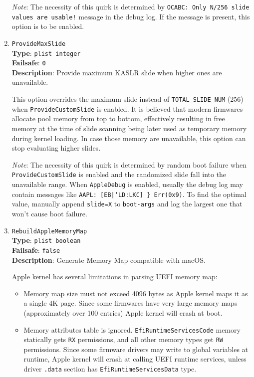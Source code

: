 \documentclass[]{article}
\providecommand{\tightlist}{%
  \setlength{\itemsep}{0pt}\setlength{\parskip}{0pt}}
\begin{document}
\begin{enumerate}
  \emph{Note}: The necessity of this quirk is determined by \texttt{OCABC: Only N/256
  slide values are usable!} message in the debug log. If the message is present,
  this option is to be enabled.

\item
  \texttt{ProvideMaxSlide}\\
  \textbf{Type}: \texttt{plist\ integer}\\
  \textbf{Failsafe}: \texttt{0}\\
  \textbf{Description}: Provide maximum KASLR slide when higher ones are unavailable.

  This option overrides the maximum slide instead of \texttt{TOTAL\_SLIDE\_NUM}
  (256) when \texttt{ProvideCustomSlide} is enabled. It is believed that modern
  firmwares allocate pool memory from top to bottom, effectively resulting in
  free memory at the time of slide scanning being later used as temporary
  memory during kernel loading. In case those memory are unavailable, this
  option can stop evaluating higher slides.

  \emph{Note}: The necessity of this quirk is determined by random boot failure
  when \texttt{ProvideCustomSlide} is enabled and the randomized slide fall
  into the unavailable range. When \texttt{AppleDebug} is enabled, usually the
  debug log may contain messages like \texttt{AAPL: [EB|`LD:LKC] \} Err(0x9)}.
  To find the optimal value, manually append \texttt{slide=X} to \texttt{boot-args}
  and log the largest one that won't cause boot failure.

\item
  \texttt{RebuildAppleMemoryMap}\\
  \textbf{Type}: \texttt{plist\ boolean}\\
  \textbf{Failsafe}: \texttt{false}\\
  \textbf{Description}: Generate Memory Map compatible with macOS.

  Apple kernel has several limitations in parsing UEFI memory map:

  \begin{itemize}
  \tightlist
  \item Memory map size must not exceed 4096 bytes as Apple kernel maps
    it as a single 4K page. Since some firmwares have very large memory maps
    (approximately over 100 entries) Apple kernel will crash at boot.
  \item Memory attributes table is ignored. \texttt{EfiRuntimeServicesCode}
    memory statically gets \texttt{RX} permissions, and all other memory types
    get \texttt{RW} permissions. Since some firmware drivers may write to global
    variables at runtime, Apple kernel will crash at calling UEFI runtime services,
    unless driver \texttt{.data} section has \texttt{EfiRuntimeServicesData}
    type.
  \end{itemize}


\end{enumerate}
\end{document}
